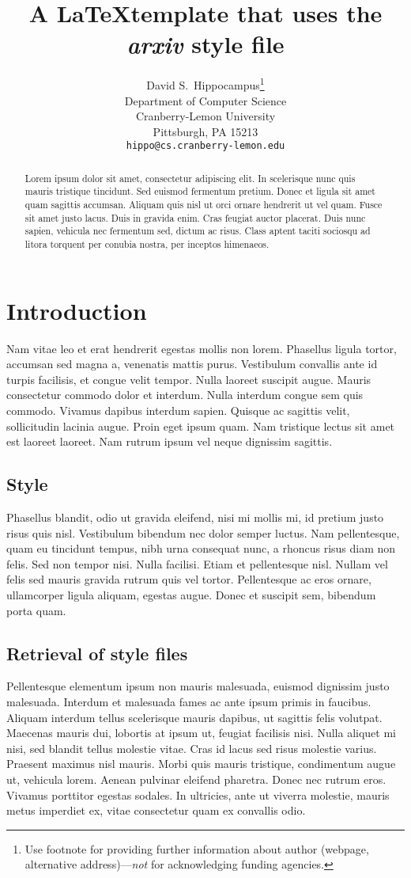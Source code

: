 \documentclass{article}
\title{A \LaTeX template that uses the \emph{arxiv} style file}
\author{
  David S.~Hippocampus\thanks{Use footnote for providing further
    information about author (webpage, alternative
    address)---\emph{not} for acknowledging funding agencies.} \\
  Department of Computer Science\\
  Cranberry-Lemon University\\
  Pittsburgh, PA 15213 \\
  \texttt{hippo@cs.cranberry-lemon.edu} \\
}
\begin{document}
\maketitle

\begin{abstract}
Lorem ipsum dolor sit amet, consectetur adipiscing elit. In scelerisque nunc quis mauris tristique tincidunt. Sed euismod fermentum pretium. Donec et ligula sit amet quam sagittis accumsan. Aliquam quis nisl ut orci ornare hendrerit ut vel quam. Fusce sit amet justo lacus. Duis in gravida enim. Cras feugiat auctor placerat. Duis nunc sapien, vehicula nec fermentum sed, dictum ac risus. Class aptent taciti sociosqu ad litora torquent per conubia nostra, per inceptos himenaeos.
\end{abstract}

\section{Introduction}
Nam vitae leo et erat hendrerit egestas mollis non lorem. Phasellus ligula tortor, accumsan sed magna a, venenatis mattis purus. Vestibulum convallis ante id turpis facilisis, et congue velit tempor. Nulla laoreet suscipit augue. Mauris consectetur commodo dolor et interdum. Nulla interdum congue sem quis commodo. Vivamus dapibus interdum sapien. Quisque ac sagittis velit, sollicitudin lacinia augue. Proin eget ipsum quam. Nam tristique lectus sit amet est laoreet laoreet. Nam rutrum ipsum vel neque dignissim sagittis.

\subsection{Style}

Phasellus blandit, odio ut gravida eleifend, nisi mi mollis mi, id pretium justo risus quis nisl. Vestibulum bibendum nec dolor semper luctus. Nam pellentesque, quam eu tincidunt tempus, nibh urna consequat nunc, a rhoncus risus diam non felis. Sed non tempor nisi. Nulla facilisi. Etiam et pellentesque nisl. Nullam vel felis sed mauris gravida rutrum quis vel tortor. Pellentesque ac eros ornare, ullamcorper ligula aliquam, egestas augue. Donec et suscipit sem, bibendum porta quam.

\subsection{Retrieval of style files}
Pellentesque elementum ipsum non mauris malesuada, euismod dignissim justo malesuada. Interdum et malesuada fames ac ante ipsum primis in faucibus. Aliquam interdum tellus scelerisque mauris dapibus, ut sagittis felis volutpat. Maecenas mauris dui, lobortis at ipsum ut, feugiat facilisis nisi. Nulla aliquet mi nisi, sed blandit tellus molestie vitae. Cras id lacus sed risus molestie varius. Praesent maximus nisl mauris. Morbi quis mauris tristique, condimentum augue ut, vehicula lorem. Aenean pulvinar eleifend pharetra. Donec nec rutrum eros. Vivamus porttitor egestas sodales. In ultricies, ante ut viverra molestie, mauris metus imperdiet ex, vitae consectetur quam ex convallis odio.
\end{document}
